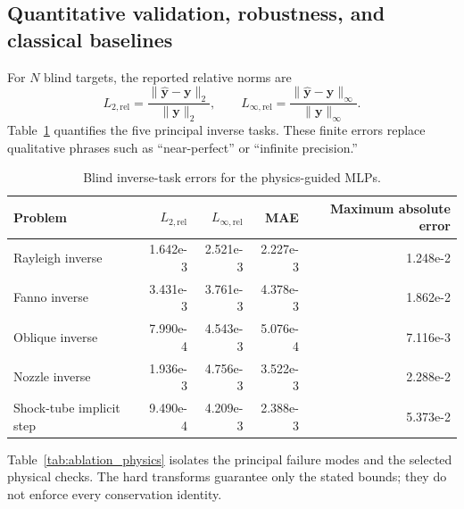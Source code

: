 \documentclass[preprint,12pt]{elsarticle}
\newenvironment{revision}{}{}
\newenvironment{revision}{\color{revisionblue}}{}
\newcommand{\relLtwo}{L_{2,\mathrm{rel}}}
\newcommand{\relLinf}{L_{\infty,\mathrm{rel}}}
\begin{document}
\begin{revision}
\subsection{Quantitative validation, robustness, and classical baselines}

For $N$ blind targets, the reported relative norms are
\begin{equation}
\relLtwo=\frac{\|\widehat{\mathbf y}-\mathbf y\|_2}{\|\mathbf y\|_2},\qquad
\relLinf=\frac{\|\widehat{\mathbf y}-\mathbf y\|_\infty}{\|\mathbf y\|_\infty}.
\end{equation}
Table~\ref{tab:primary_metrics} quantifies the five principal inverse tasks. These finite errors replace qualitative phrases such as ``near-perfect'' or ``infinite precision.''

\begin{table}[H]
\centering
\caption{Blind inverse-task errors for the physics-guided MLPs.}
\label{tab:primary_metrics}
\small
\begin{tabular}{lrrrr}
\toprule
Problem & $\relLtwo$ & $\relLinf$ & MAE & Maximum absolute error \\
\midrule
Rayleigh inverse & 1.642e-3 & 2.521e-3 & 2.227e-3 & 1.248e-2 \\
Fanno inverse & 3.431e-3 & 3.761e-3 & 4.378e-3 & 1.862e-2 \\
Oblique inverse & 7.990e-4 & 4.543e-3 & 5.076e-4 & 7.116e-3 \\
Nozzle inverse & 1.936e-3 & 4.756e-3 & 3.522e-3 & 2.288e-2 \\
Shock-tube implicit step & 9.490e-4 & 4.209e-3 & 2.388e-3 & 5.373e-2 \\
\bottomrule
\end{tabular}
\end{table}

Table~\ref{tab:ablation_physics} isolates the principal failure modes and the selected physical checks. The hard transforms guarantee only the stated bounds; they do not enforce every conservation identity.


\end{revision}
\end{document}
